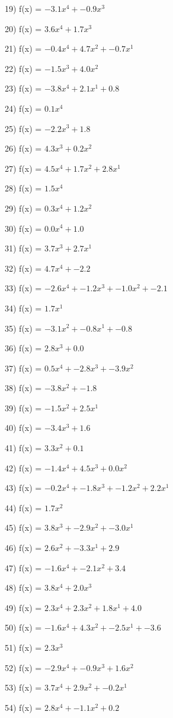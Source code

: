 \documentclass[10pt,a4paper]{article}
\begin{document}
19) f(x) = $-3.1x^4 + -0.9x^3$

20) f(x) = $3.6x^4 + 1.7x^3$

21) f(x) = $-0.4x^4 + 4.7x^2 + -0.7x^1$

22) f(x) = $-1.5x^3 + 4.0x^2$

23) f(x) = $-3.8x^4 + 2.1x^1 + 0.8$

24) f(x) = $0.1x^4$

25) f(x) = $-2.2x^3 + 1.8$

26) f(x) = $4.3x^3 + 0.2x^2$

27) f(x) = $4.5x^4 + 1.7x^2 + 2.8x^1$

28) f(x) = $1.5x^4$

29) f(x) = $0.3x^4 + 1.2x^2$

30) f(x) = $0.0x^4 + 1.0$

31) f(x) = $3.7x^3 + 2.7x^1$

32) f(x) = $4.7x^4 + -2.2$

33) f(x) = $-2.6x^4 + -1.2x^3 + -1.0x^2 + -2.1$

34) f(x) = $1.7x^1$

35) f(x) = $-3.1x^2 + -0.8x^1 + -0.8$

36) f(x) = $2.8x^3 + 0.0$

37) f(x) = $0.5x^4 + -2.8x^3 + -3.9x^2$

38) f(x) = $-3.8x^2 + -1.8$

39) f(x) = $-1.5x^2 + 2.5x^1$

40) f(x) = $-3.4x^3 + 1.6$

41) f(x) = $3.3x^2 + 0.1$

42) f(x) = $-1.4x^4 + 4.5x^3 + 0.0x^2$

43) f(x) = $-0.2x^4 + -1.8x^3 + -1.2x^2 + 2.2x^1$

44) f(x) = $1.7x^2$

45) f(x) = $3.8x^3 + -2.9x^2 + -3.0x^1$

46) f(x) = $2.6x^2 + -3.3x^1 + 2.9$

47) f(x) = $-1.6x^4 + -2.1x^2 + 3.4$

48) f(x) = $3.8x^4 + 2.0x^3$

49) f(x) = $2.3x^4 + 2.3x^2 + 1.8x^1 + 4.0$

50) f(x) = $-1.6x^4 + 4.3x^2 + -2.5x^1 + -3.6$

51) f(x) = $2.3x^3$

52) f(x) = $-2.9x^4 + -0.9x^3 + 1.6x^2$

53) f(x) = $3.7x^4 + 2.9x^2 + -0.2x^1$

54) f(x) = $2.8x^4 + -1.1x^2 + 0.2$
\end{document}

